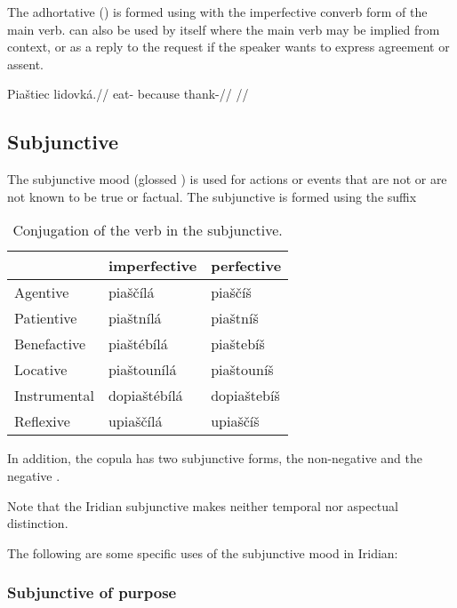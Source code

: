 The adhortative () is formed using  with the imperfective converb form of the main verb.  can also be used by itself where the main verb may be implied from context, or as a reply to the request if the speaker wants to express agreement or assent.

\pex
\begingl
\gla Piaštiec lidovká.//
\glb eat- because thank-//
\glft {}//
\endgl
\xe

\subsection{Subjunctive}

The subjunctive mood (glossed ) is used for actions or events that are not or are not known to be true or factual. The subjunctive is formed using the suffix 

\begin{table}[ht!]
	\footnotesize\sffamily
	\caption{Conjugation of the verb  in the subjunctive.}
	\medskip
	\begin{tabu}to 0.7
		\toprule
		&{\sc imperfective} &{\sc perfective}\\
		\midrule
		Agentive	& piaščílá	& piaščíš\\
		Patientive	& piaštnílá		& piaštníš\\
		Benefactive	& piaštébílá		& piaštebíš\\
		Locative	& piaštounílá		& piaštouníš\\
		Instrumental& dopiaštébílá	& dopiaštebíš\\
		Reflexive	& upiaščílá	& upiaščíš\\
		\bottomrule
	\end{tabu}
\end{table}

In addition, the copula has two subjunctive forms, the non-negative  and the negative .

Note that the Iridian subjunctive makes neither temporal nor aspectual distinction.

\par The following are some specific uses of the subjunctive mood in Iridian:

\subsubsection{Subjunctive of purpose}

